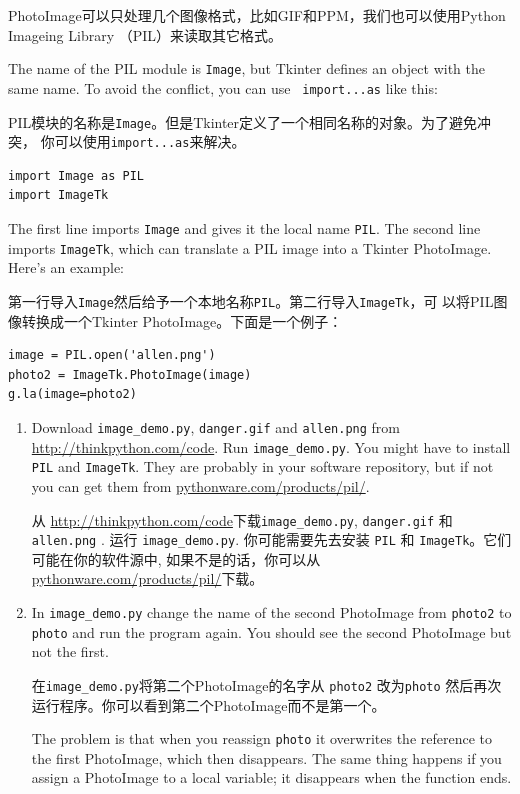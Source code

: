 \documentclass[10pt]{book}
\begin{document}
\begin{CJK}{UTF8}{gbsn}
\begin{exercise}
PhotoImage可以只处理几个图像格式，比如GIF和PPM，我们也可以使用Python Imageing
Library （PIL）来读取其它格式。

The name of the PIL module is {\tt Image}, but Tkinter defines an
object with the same name.  To avoid the conflict, you can use {\tt
  import...as} like this:

PIL模块的名称是{\tt Image}。但是Tkinter定义了一个相同名称的对象。为了避免冲突，
你可以使用{\tt import...as}来解决。

\begin{verbatim}
import Image as PIL
import ImageTk
\end{verbatim}
%
The first line imports {\tt Image} and
gives it the local name {\tt PIL}.  The second
line imports {\tt ImageTk}, which can translate a PIL
image into a Tkinter PhotoImage.  Here's an example:

第一行导入{\tt Image}然后给予一个本地名称{\tt PIL}。第二行导入{\tt ImageTk}，可
以将PIL图像转换成一个Tkinter PhotoImage。下面是一个例子：

\begin{verbatim}
image = PIL.open('allen.png')
photo2 = ImageTk.PhotoImage(image)
g.la(image=photo2)
\end{verbatim}
%

\begin{enumerate}

\item Download \verb"image_demo.py", \verb"danger.gif" and \verb"allen.png"
from \url{http://thinkpython.com/code}.  Run \verb"image_demo.py".  You
might have to install {\tt PIL} and {\tt ImageTk}.  
They are probably in your software repository,  but if not
you can get them from \url{pythonware.com/products/pil/}.


从 \url{http://thinkpython.com/code}下载\verb"image_demo.py", \verb"danger.gif"
和 \verb"allen.png" .  运行 \verb"image_demo.py".  你可能需要先去安装 {\tt PIL}
和 {\tt ImageTk}。它们可能在你的软件源中,  如果不是的话，你可以从
\url{pythonware.com/products/pil/}下载。

\item In \verb"image_demo.py" change the name of the second
PhotoImage from {\tt photo2} to {\tt photo} and run the program
again.  You should see the second PhotoImage but not the first.

在\verb"image_demo.py"将第二个PhotoImage的名字从 {\tt photo2} 改为{\tt photo}
然后再次运行程序。你可以看到第二个PhotoImage而不是第一个。

The problem is that when you reassign {\tt photo} it overwrites
the reference to the first PhotoImage, which then disappears.  The
same thing happens if you assign a PhotoImage to a local
variable; it disappears when the function ends.


\end{enumerate}
\end{exercise}
\end{CJK}
\end{document}
